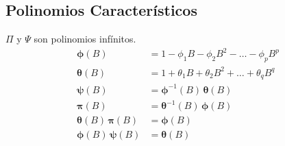 \documentclass[12pt]{article} %
\begin{document}
\begin{multicols}{3}
\section*{Polinomios Característicos}
$\Pi$ y $\Psi$ son polinomios infínitos.
\begin{align*}
\boldsymbol{\phi}(B) &= 1 - \phi_1 B - \phi_2 B^2 - \dots - \phi_p B^p \\
\boldsymbol{\theta}(B) &= 1 + \theta_1 B + \theta_2 B^2 + \dots + \theta_q B^q \\
\boldsymbol{\psi}(B) &= \boldsymbol{\phi}^{-1}(B) \, \boldsymbol{\theta}(B) \\
\boldsymbol{\pi}(B) &= \boldsymbol{\theta}^{-1}(B) \, \boldsymbol{\phi}(B) \\
\boldsymbol{\theta}(B) \, \boldsymbol{\pi}(B) &= \boldsymbol{\phi}(B) \\
\boldsymbol{\phi}(B) \, \boldsymbol{\psi}(B) &= \boldsymbol{\theta}(B)
\end{align*}




\end{multicols}
\newpage
\end{document}
